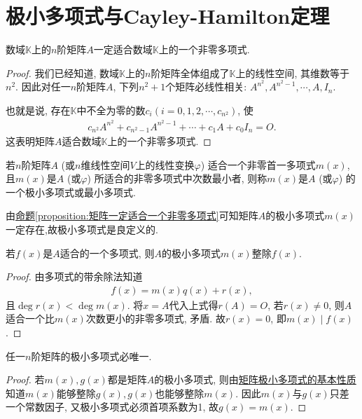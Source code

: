 \documentclass[../../main.tex]{subfiles}
\begin{document}
\section{极小多项式与Cayley-Hamilton定理}

\begin{proposition}\label{proposition:矩阵一定适合一个非零多项式}
数域$\mathbb{K}$上的$n$阶矩阵$A$一定适合数域$\mathbb{K}$上的一个非零多项式.
\end{proposition}
\begin{proof}
我们已经知道, 数域$\mathbb{K}$上的$n$阶矩阵全体组成了$\mathbb{K}$上的线性空间, 其维数等于$n^2$. 因此对任一$n$阶矩阵$A$, 下列$n^2 + 1$个矩阵必线性相关:
$A^{n^2}, A^{n^2-1}, \cdots, A, I_n$.

也就是说, 存在$\mathbb{K}$中不全为零的数$c_i (i = 0, 1, 2, \cdots, c_{n^2})$, 使
\begin{align*}
c_{n^2}A^{n^2} + c_{n^2-1}A^{n^2-1} + \cdots + c_1A + c_0I_n = O.
\end{align*}
这表明矩阵$A$适合数域$\mathbb{K}$上的一个非零多项式.
\end{proof}

\begin{definition}[矩阵的极小多项式]
若$n$阶矩阵$A$ (或$n$维线性空间$V$上的线性变换$\varphi$) 适合一个非零首一多项式$m(x)$, 且$m(x)$是$A$ (或$\varphi$) 所适合的非零多项式中次数最小者, 则称$m(x)$是$A$ (或$\varphi$) 的一个极小多项式或最小多项式.
\end{definition}
\begin{remark}
由\hyperref[proposition:矩阵一定适合一个非零多项式]{命题\ref{proposition:矩阵一定适合一个非零多项式}}可知矩阵$A$的极小多项式$m(x)$一定存在,故极小多项式是良定义的.
\end{remark}

\begin{lemma}[矩阵极小多项式的基本性质]\label{lemma:矩阵极小多项式的基本性质}
若$f(x)$是$A$适合的一个多项式, 则$A$的极小多项式$m(x)$整除$f(x)$.
\end{lemma}
\begin{proof}
由多项式的带余除法知道
\begin{align*}
f(x) = m(x)q(x) + r(x),
\end{align*}
且$\deg r(x) < \deg m(x)$. 将$x = A$代入上式得$r(A) = O$, 若$r(x) \neq 0$, 则$A$适合一个比$m(x)$次数更小的非零多项式, 矛盾. 故$r(x) = 0$, 即$m(x) \mid f(x)$.
\end{proof}

\begin{proposition}[矩阵的极小多项式必唯一]\label{proposition:矩阵的极小多项式必唯一}
任一$n$阶矩阵的极小多项式必唯一.
\end{proposition}
\begin{proof}
若$m(x), g(x)$都是矩阵$A$的极小多项式, 则由\hyperref[lemma:矩阵极小多项式的基本性质]{矩阵极小多项式的基本性质}知道$m(x)$能够整除$g(x), g(x)$也能够整除$m(x)$. 因此$m(x)$与$g(x)$只差一个常数因子, 又极小多项式必须首项系数为1, 故$g(x) = m(x)$.
\end{proof}
\end{document}
